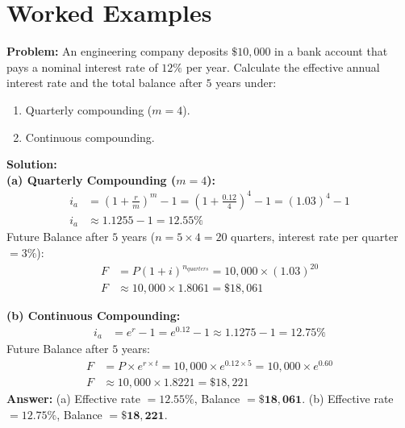 \documentclass[12pt,a4paper]{article}
\begin{document}
\section{Worked Examples}

\begin{tcolorbox}[examplebox, title={Example 1: Nominal vs. Effective Interest}]
\textbf{Problem:} An engineering company deposits $\$10,000$ in a bank account that pays a nominal interest rate of $12\%$ per year. Calculate the effective annual interest rate and the total balance after $5$ years under:
\begin{enumerate}[label=\alph*., leftmargin=*, itemsep=2pt, topsep=2pt]
  \item Quarterly compounding ($m = 4$).
  \item Continuous compounding.
\end{enumerate}
\textbf{Solution:}\\[4pt]
\textbf{(a) Quarterly Compounding ($m = 4$):}
\begin{align*}
  i_a &= \left( 1 + \frac{r}{m} \right)^m - 1 = \left( 1 + \frac{0.12}{4} \right)^4 - 1 = (1.03)^4 - 1 \\
  i_a &\approx 1.1255 - 1 = 12.55\%
\end{align*}
Future Balance after $5$ years ($n = 5 \times 4 = 20$ quarters, interest rate per quarter $= 3\%$):
\begin{align*}
  F &= P(1 + i)^{n_{quarters}} = 10,000 \times (1.03)^{20} \\
  F &\approx 10,000 \times 1.8061 = \$18,061
\end{align*}

\textbf{(b) Continuous Compounding:}
\begin{align*}
  i_a &= e^r - 1 = e^{0.12} - 1 \approx 1.1275 - 1 = 12.75\%
\end{align*}
Future Balance after $5$ years:
\begin{align*}
  F &= P \times e^{r \times t} = 10,000 \times e^{0.12 \times 5} = 10,000 \times e^{0.60} \\
  F &\approx 10,000 \times 1.8221 = \$18,221
\end{align*}
\textbf{Answer:} (a) Effective rate $= \mathbf{12.55\%}$, Balance $= \mathbf{\$18,061}$. (b) Effective rate $= \mathbf{12.75\%}$, Balance $= \mathbf{\$18,221}$.
\end{tcolorbox}
\end{document}
